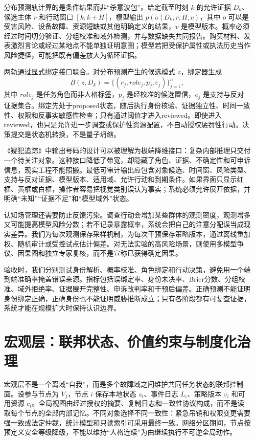 分布预测轨计算的是条件结果而非“杀意波包”。给定截至时刻 $k$ 的允许证据 $D_k$、候选主体 $r$ 和行动窗口 $[k,k+H]$，模型输出 $p(o\mid D_k,r,H,v)$，其中 $o$ 可以是受害风险、设备故障、资源短缺或其他明确定义的结果，$v$ 是模型版本。概率必须经过时间切分验证、分组校准和域外检测，并与数据缺失共同报告。购买材料、发表激烈言论或经过某地点不能单独证明意图；模型若把受保护属性或执法历史当作风险捷径，可能把既有偏差放大为循环证据。

两轨通过显式绑定接口联合。对分布预测产生的候选模式 $z$，绑定器生成
\begin{equation}
 B(z,D_k)=\{(r_j,role_j,p_j,e_j)\}_{j=1}^{n},
\end{equation}
其中 $role_j$ 是任务角色而非人格标签，$p_j$ 是经校准的候选置信，$e_j$ 是支持与反对证据集合。绑定先处于proposed状态，随后执行身份核验、证据独立性、时间一致性、权限和反事实敏感性检查；只有通过阈值才进入reviewed。即使进入reviewed，也只是允许进一步调查或保护性资源配置，不自动授权惩罚性行动。决策提交是状态机转换，不是量子坍缩。

《疑犯追踪》中输出号码的设计可以被理解为极端降维接口：复杂内部推理只交付一个待关注对象。这种接口降低了带宽，却隐藏了角色、证据、不确定性和可申诉信息，现实工程不能照搬。最低可审计输出应包含对象候选、时间窗、风险类型、支持与反对证据、模型版本、适用域、允许行动和到期条件。如果界面只显示红框、黄框或白框，操作者容易把视觉类别误认为事实；系统必须允许展开依据，并明确“未知”“证据不足”和“模型域外”状态。

认知场管理还需要防止反馈污染。调查行动会增加某些群体的观测密度，观测增多又可能提高模型风险分数；若不记录暴露概率，系统会把自己的注意分配误当成现实差异。我们为每次观测保存采样机制，为每次干预保存策略版本，通过离线重加权、随机审计或受控试点估计偏差。对无法实验的高风险场景，则使用多模型争议、因果图和独立专家复核，而不是宣称已获得确定因果。

验收时，我们分别测试身份解析、概率校准、角色绑定和行动决策，避免用一个端到端准确率掩盖错误来源。指标包括误绑定率、身份未决率、Brier分数、分组校准、域外拒绝率、证据展开完整性、申诉改判率和干预后偏差。正确预测不能证明身份绑定正确，正确身份也不能证明威胁推断成立；只有各阶段都有可复查证据，系统才能在规模扩大时保持认识边界。

\section{宏观层：联邦状态、价值约束与制度化治理}
\label{sec:gaia_macro_layer}

宏观层不是一个离域“自我”，而是多个故障域之间维护共同任务状态的联邦控制面。设参与节点为 $V_f$，节点 $i$ 保存本地状态 $s_i$、事件日志 $L_i$、策略版本 $v_i$ 和可用资源 $c_i$。全局视图由经过授权的摘要、复制日志和一致性协议构成，而不是读取每个节点的全部内部记忆。不同对象选择不同一致性：紧急吊销和权限变更需要强一致或法定仲裁，统计模型和只读索引可采用最终一致。网络分区期间，节点按预定义安全等级降级，不能以维持“人格连续”为由继续执行不可逆全局动作。

